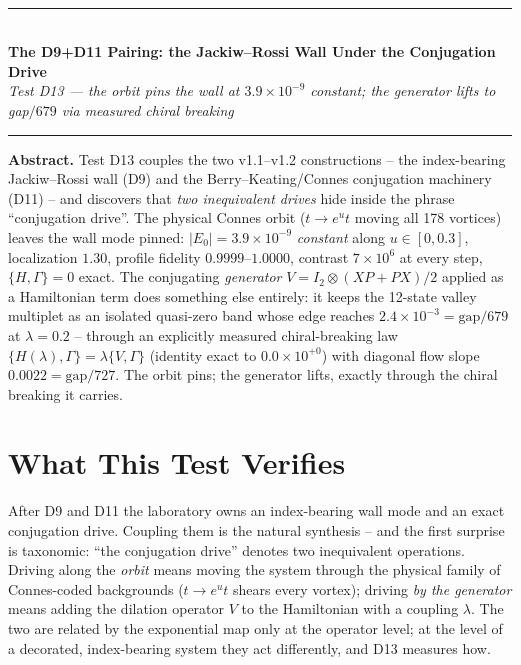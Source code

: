 \documentclass[11pt,a4paper]{article}
\begin{document}
\\[0.3em]
\rule{\textwidth}{0.8pt}\\[0.6em]
{\LARGE\bfseries\color{labblue} The D9+D11 Pairing: the Jackiw--Rossi Wall Under the Conjugation Drive}\\[0.5em]
{\normalsize\itshape Test D13 — the orbit pins the wall at $3.9\times10^{-9}$ constant; the generator lifts to gap$/679$ via measured chiral breaking}\\[0.4em]
\rule{\textwidth}{0.4pt}

\begin{tcolorbox}[colback=labgreen!8, colframe=labgreen!70!black, title={Verdict: PASS — 10/10 checks}, fonttitle=\bfseries, boxrule=0.6pt]
\textbf{Abstract.} Test D13 couples the two v1.1--v1.2 constructions -- the index-bearing Jackiw--Rossi wall (D9) and the Berry--Keating/Connes conjugation machinery (D11) -- and discovers that \emph{two inequivalent drives} hide inside the phrase ``conjugation drive''. The physical Connes orbit ($t \to e^{u}t$ moving all 178 vortices) leaves the wall mode pinned: $|E_0| = 3.9\times10^{-9}$ \emph{constant} along $u \in [0, 0.3]$, localization $1.30$, profile fidelity $0.9999$--$1.0000$, contrast $7\times10^{6}$ at every step, $\{H,\Gamma\} = 0$ exact. The conjugating \emph{generator} $V = I_2 \otimes (XP + PX)/2$ applied as a Hamiltonian term does something else entirely: it keeps the 12-state valley multiplet as an isolated quasi-zero band whose edge reaches $2.4\times10^{-3} = \mathrm{gap}/679$ at $\lambda = 0.2$ -- through an explicitly measured chiral-breaking law $\{H(\lambda), \Gamma\} = \lambda\{V, \Gamma\}$ (identity exact to $0.0\times10^{+0}$) with diagonal flow slope $0.0022 = \mathrm{gap}/727$. The orbit pins; the generator lifts, exactly through the chiral breaking it carries.
\end{tcolorbox}

\section{What This Test Verifies}
After D9 and D11 the laboratory owns an index-bearing wall mode and an exact conjugation drive. Coupling them is the natural synthesis -- and the first surprise is taxonomic: ``the conjugation drive'' denotes two inequivalent operations. Driving along the \emph{orbit} means moving the system through the physical family of Connes-coded backgrounds ($t \to e^u t$ shears every vortex); driving \emph{by the generator} means adding the dilation operator $V$ to the Hamiltonian with a coupling $\lambda$. The two are related by the exponential map only at the operator level; at the level of a decorated, index-bearing system they act differently, and D13 measures how.
\end{document}
